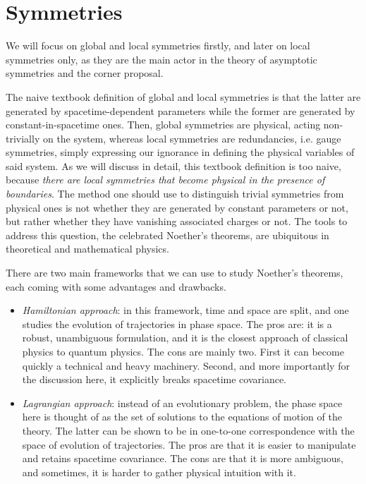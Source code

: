 \section{Symmetries}
 We will focus on global and local symmetries firstly, and later on local symmetries only, as they are the main actor in the theory of asymptotic symmetries and the corner proposal.
 
 The naive textbook definition of global and local symmetries is that the latter are generated by spacetime-dependent parameters while the former are generated by constant-in-spacetime ones. Then, global symmetries are physical, acting non-trivially on the system, whereas local symmetries are redundancies, i.e. gauge symmetries, simply expressing our ignorance in defining the physical variables of said system. As we will discuss in detail, this textbook definition is too naive, because \textit{there are local symmetries that become physical in the presence of boundaries}. The method one should use to distinguish trivial symmetries from physical ones is not whether they are generated by constant parameters or not, but rather whether they have vanishing associated charges or not. The tools to address this question, the celebrated Noether’s theorems, are ubiquitous in theoretical and mathematical physics.
 
 There are two main frameworks that we can use to study Noether's theorems, each coming with some advantages and drawbacks.
 
 \begin{itemize}
 	\item \textit{Hamiltonian approach}: in this framework, time and space are split, and one studies the evolution of trajectories in phase space. The pros are: it is a robust, unambiguous formulation, and it is the closest approach of classical physics to quantum physics. The cons are mainly two. First it can become quickly a technical and heavy machinery. Second, and more importantly for the discussion here, it explicitly breaks spacetime covariance.
 	\item \textit{Lagrangian approach}: instead of an evolutionary problem, the phase space here is thought of as the set of solutions to the equations of motion of the theory. The latter can be shown to be in one-to-one correspondence with the space of evolution of trajectories. The pros are that it is easier to manipulate and retains spacetime covariance. The cons are that it is more ambiguous, and sometimes, it is harder to gather physical intuition with it.
 \end{itemize}
 
